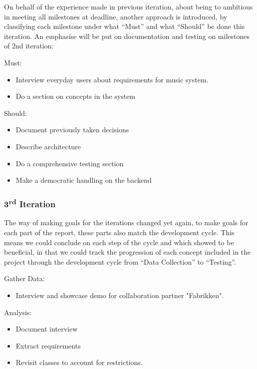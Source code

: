 	On behalf of the experience made in previous iteration, about being to ambitious in meeting all milestones at deadline, another approach is introduced, by classifying each milestone under what \enquote{Must} and what \enquote{Should} be done this iteration. An emphasise will be put on documentation and testing on milestones of 2nd iteration:

	Must:
	\begin{itemize}
		\item Interview everyday users about requirements for music system.
		\item Do a section on concepts in the system
	\end{itemize}

	Should:
	\begin{itemize}
		\item Document previously taken decisions
		\item Describe architecture
		\item Do a comprehensive testing section
		\item Make a democratic handling on the backend
	\end{itemize}

\subsubsection{3\textsuperscript{rd} Iteration}

  The way of making goals for the iterations changed yet again, to make goals for each part of the report, these parts also match the development cycle. This means we could conclude on each step of the cycle and which showed to be beneficial, in that we could track the progression of each concept included in the project through the development cycle from \enquote{Data Collection} to \enquote{Testing}.

  Gather Data:
  \begin{itemize}
    \item Interview and showcase demo for collaboration partner "Fabrikken".
  \end{itemize}

  Analysis:
  \begin{itemize}
    \item Document interview
    \item Extract requirements
    \item Revisit classes to account for restrictions.
  \end{itemize}

